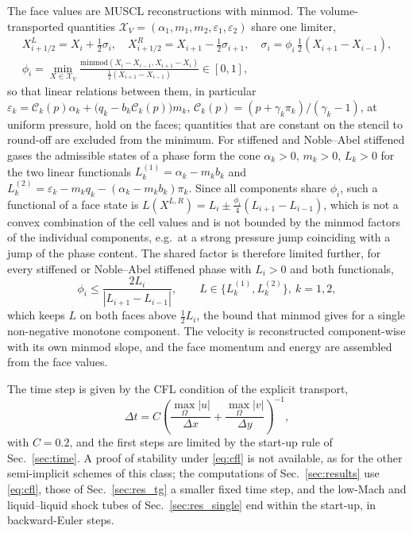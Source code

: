 \documentclass[a4paper,fleqn]{cas-sc}
\begin{document}
The face values are MUSCL reconstructions \cite{vanLeer1979} with minmod. The volume-transported quantities
$\mathcal X_V=(\alpha_1,m_1,m_2,\varepsilon_1,\varepsilon_2)$ share one limiter,
\begin{equation}
\begin{gathered}
X^L_{i+1/2}=X_i+\tfrac12\sigma_i,\quad X^R_{i+1/2}=X_{i+1}-\tfrac12\sigma_{i+1},\quad \sigma_i=\phi_i\,\tfrac12(X_{i+1}-X_{i-1}),\\
\phi_i=\min_{X\in\mathcal X_V}\frac{\mathrm{minmod}(X_i-X_{i-1},X_{i+1}-X_i)}{\tfrac12(X_{i+1}-X_{i-1})}\in[0,1],
\end{gathered}
\label{eq:shared_limiter}
\end{equation}
so that linear relations between them, in particular $\varepsilon_k=\mathcal C_k(p)\alpha_k+\big(q_k-b_k\mathcal C_k(p)\big)m_k$, $\mathcal C_k(p)=(p+\gamma_k\pi_k)/(\gamma_k-1)$, at
uniform pressure, hold on the faces; quantities that are constant on the stencil to round-off are excluded from the minimum.
For stiffened and Noble--Abel stiffened gases the admissible states of a phase form the cone $\alpha_k>0$, $m_k>0$, $L_k>0$ for the
two linear functionals $L^{(1)}_k=\alpha_k-m_kb_k$ and $L^{(2)}_k=\varepsilon_k-m_kq_k-(\alpha_k-m_kb_k)\pi_k$. Since all components share $\phi_i$, such a
functional of a face state is $L(X^{L,R})=L_i\pm\tfrac{\phi_i}4(L_{i+1}-L_{i-1})$, which is not a convex combination of the cell values and is not
bounded by the minmod factors of the individual components, e.g.\ at a strong pressure jump coinciding with a jump of
the phase content. The shared factor is therefore limited further, for every stiffened or Noble--Abel stiffened phase with $L_i>0$ and both
functionals,
\begin{equation}
\phi_i\le\frac{2L_i}{|L_{i+1}-L_{i-1}|},\qquad L\in\{L^{(1)}_k,L^{(2)}_k\},\ k=1,2 ,
\label{eq:phi_cap}
\end{equation}
which keeps $L$ on both faces above $\tfrac12L_i$, the bound that minmod gives for a single non-negative monotone component. The velocity is reconstructed component-wise with its own minmod slope, and the face
momentum and energy are assembled from the face values.

The time step is given by the CFL condition of the explicit transport,
\begin{equation}
\Delta t=C\left(\frac{\max_\Omega|u|}{\Delta x}+\frac{\max_\Omega|v|}{\Delta y}\right)^{-1},
\label{eq:cfl}
\end{equation}
with $C=0.2$, and the first steps are limited by the
start-up rule of Sec.~\ref{sec:time}. A proof of stability under \eqref{eq:cfl} is not available, as for the
other semi-implicit schemes of this class; the computations of Sec.~\ref{sec:results} use \eqref{eq:cfl}, those of
Sec.~\ref{sec:res_tg} a smaller fixed time step, and the low-Mach and liquid--liquid shock tubes of Sec.~\ref{sec:res_single}
end within the start-up, in backward-Euler steps.
\end{document}
